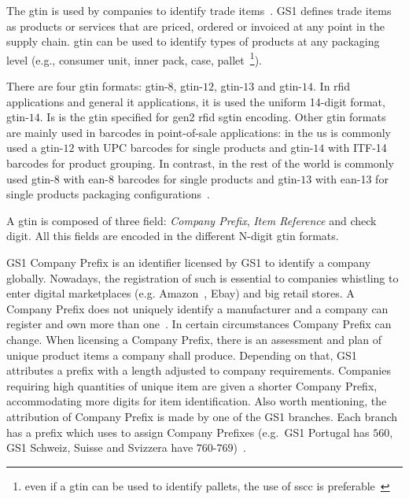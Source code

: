 The \ac{gtin} is used by companies to identify trade items~\cite{GS1GTINExecutive, GS1GTINManagement}. 
GS1 defines trade items as products or services that are priced, ordered or invoiced at any point in the supply chain.
\ac{gtin} can be used to identify types of products at any packaging level (e.g., consumer unit, inner pack, case, pallet~\footnote{even if a \ac{gtin} can be used to identify pallets, the use of \ac{sscc} is preferable~\cite{GS1KeysImplementation}}).

There are four \ac{gtin} formats: \ac{gtin}-$8$, \ac{gtin}-$12$, \ac{gtin}-$13$ and \ac{gtin}-$14$. In \ac{rfid} applications and general \ac{it} applications, it is used the uniform 14-digit format, \ac{gtin}-$14$. Is is the \ac{gtin} specified for \ac{gen2} \ac{rfid} \ac{sgtin} encoding.
Other \ac{gtin} formats are mainly used in barcodes in point-of-sale applications: in the \ac{us} is commonly used a \ac{gtin}-$12$ with UPC barcodes for single products and \ac{gtin}-$14$ with ITF-14 barcodes for product grouping. In contrast, in the rest of the world is commonly used \ac{gtin}-$8$ with \ac{ean}-8 barcodes for single products and \ac{gtin}-$13$ with \ac{ean}-13 for single products packaging configurations~\cite{BarcodeGS1General,GS1BarcodeChart}.

A \ac{gtin} is composed of three field: \emph{Company Prefix}, \emph{Item Reference} and check digit. All this fields are encoded in the different N-digit \ac{gtin} formats. 

GS1 Company Prefix is an identifier licensed by GS1 to identify a company globally. 
Nowadays, the registration of such is essential to companies whistling to enter digital marketplaces (e.g. Amazon~\cite{ListingRequirementsProduct}, Ebay) and big retail stores.
A Company Prefix does not uniquely identify a manufacturer and a company can register and own more than one~\cite{GS1EPCglobalArchitecture}. In certain circumstances Company Prefix can change.
When licensing a Company Prefix, there is an assessment and plan of unique product items a company shall produce. 
Depending on that, GS1 attributes a prefix with a length adjusted to company requirements. 
Companies requiring high quantities of unique item are given a shorter Company Prefix, accommodating more digits for item identification.
Also worth mentioning, the attribution of Company Prefix is made by one of the GS1 branches. Each branch has a prefix which uses to assign Company Prefixes (e.g.\ GS1 Portugal has $560$, GS1 Schweiz, Suisse and Svizzera have $760$-$769$)~\cite{anonymousGS1CompanyPrefix2014}.

